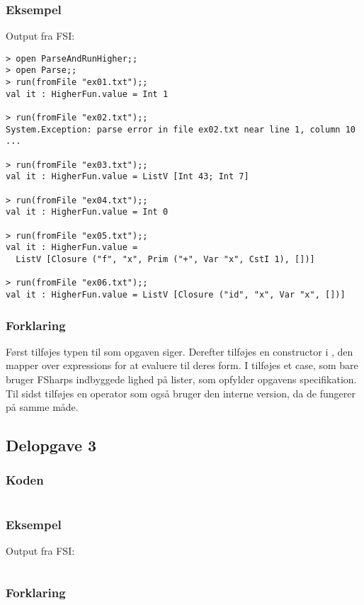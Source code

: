 \subsubsection{Eksempel}
Output fra FSI:
\begin{lstlisting}
> open ParseAndRunHigher;;
> open Parse;;
> run(fromFile "ex01.txt");;
val it : HigherFun.value = Int 1

> run(fromFile "ex02.txt");;
System.Exception: parse error in file ex02.txt near line 1, column 10
...

> run(fromFile "ex03.txt");;
val it : HigherFun.value = ListV [Int 43; Int 7]

> run(fromFile "ex04.txt");;
val it : HigherFun.value = Int 0

> run(fromFile "ex05.txt");;
val it : HigherFun.value =
  ListV [Closure ("f", "x", Prim ("+", Var "x", CstI 1), [])]

> run(fromFile "ex06.txt");;
val it : HigherFun.value = ListV [Closure ("id", "x", Var "x", [])]

\end{lstlisting}

\subsubsection{Forklaring}
Først tilføjes typen til  som opgaven siger. Derefter tilføjes en constructor i , den mapper over expressions for at evaluere til deres  form. I  tilføjes et \li{=} case, som bare bruger FSharps indbyggede lighed på lister, som opfylder opgavens specifikation. Til sidst tilføjes en  operator som også bruger den interne version, da de fungerer på samme måde.


\subsection{Delopgave 3}\label{ass:4-3}
\subsubsection{Koden}
\begin{lstlisting}[language=fsharp]

\end{lstlisting}

\subsubsection{Eksempel}
Output fra FSI:
\begin{lstlisting}

\end{lstlisting}

\subsubsection{Forklaring}


